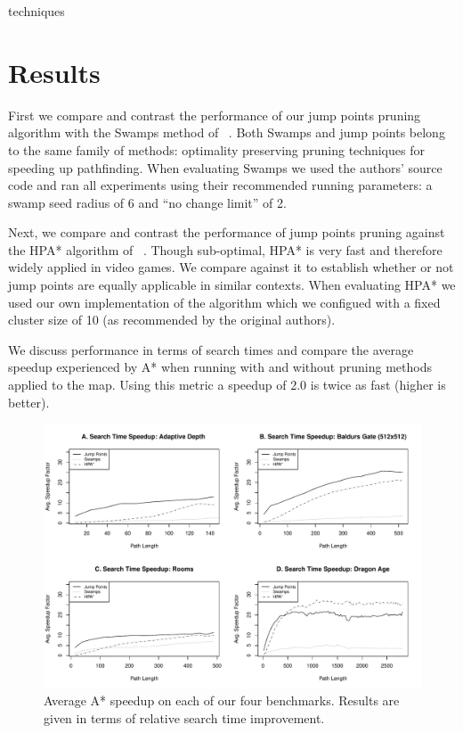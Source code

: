 techniques\section{Results}
First we compare and contrast the performance of our jump points
pruning algorithm with the Swamps method of
\citeauthor{pochter10}~. 
Both Swamps and jump points belong to the same family of methods:
optimality preserving pruning techniques for speeding up pathfinding.
When evaluating Swamps we used the authors'
source code and ran all experiments using their recommended running parameters:
a swamp seed radius of 6 and ``no change limit'' of 2. 
\par
Next, we compare and contrast the performance of jump points pruning 
against the HPA* algorithm of \citeauthor{botea04}~.
Though sub-optimal, HPA* is very fast and therefore widely applied in video
games. We compare against it to establish whether or not jump points are 
equally applicable in similar contexts. 
When evaluating HPA* we used our own implementation of the algorithm which we 
configued with a fixed cluster size of 10 (as recommended by the original authors).
\par
We discuss performance in terms of search times and compare 
the average speedup experienced by A* when running with and
without pruning methods applied to the map.  
Using this metric a speedup of 2.0 is twice as fast (higher is better).

\begin{figure}[t]
   \begin{center}
	   \includegraphics[width=1.75\columnwidth, trim = 10mm 10mm 10mm 0mm]
		{diagrams/speedup.pdf}
   \end{center}
   \caption{Average A* speedup on each of our four benchmarks. 
	Results are given in terms of relative search time improvement.}
\label{fig:speedup}
\end{figure}

